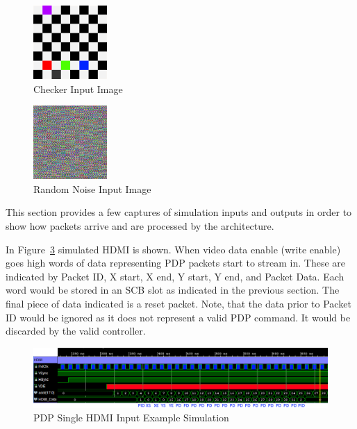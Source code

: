 
\begin{figure}
    \centering
    \includegraphics[width=0.25\textwidth]{fig/checker.png}
    \caption{Checker Input Image}
    \label{fig:checker_pattern}
\end{figure}

\begin{figure}
    \centering
    \includegraphics[width=0.25\textwidth]{fig/random_noise.png}
    \caption{Random Noise Input Image}
    \label{fig:random_noise}
\end{figure}

This section provides a few captures of simulation inputs and outputs in order to show how packets arrive and are processed by the architecture.

In Figure~\ref{fig:input_example} simulated HDMI is shown. When video data enable (write enable) goes high words of data representing PDP packets start to stream in. These are indicated by Packet ID, X start, X end, Y start, Y end, and Packet Data. Each word would be stored in an SCB slot as indicated in the previous section. The final piece of data indicated is a reset packet. Note, that the data prior to Packet ID would be ignored as it does not represent a valid PDP command. It would be discarded by the valid controller.

\begin{figure}
    \centering
    \includegraphics[width=1.0\textwidth]{fig/pdp_input_example.png}
    \caption{PDP Single HDMI Input Example Simulation}
    \label{fig:input_example}
\end{figure}

